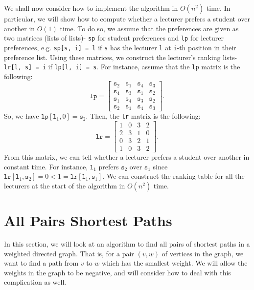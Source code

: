 \documentclass[a4paper, openany]{memoir}
\begin{document}
    We shall now consider how to implement the algorithm in $O(n^2)$ time. In particular, we will show how to compute whether a lecturer prefers a student over another in $O(1)$ time. To do so, we assume that the preferences are given as two matrices (lists of lists)- \texttt{sp} for student preferences and \texttt{lp} for lecturer preferences, e.g. \texttt{sp[s, i] = l} if \texttt{s} has the lecturer \texttt{l} at \texttt{i}-th position in their preference list. Using these matrices, we construct the lecturer's ranking lists- \texttt{lr[l, s] = i} if \texttt{lp[l, i] = s}. For instance, assume that the \texttt{lp} matrix is the following:
    \[\texttt{lp} = \begin{bmatrix}
        \texttt{s}_2 & \texttt{s}_1 & \texttt{s}_4 & \texttt{s}_3 \\
        \texttt{s}_4 & \texttt{s}_3 & \texttt{s}_1 & \texttt{s}_2 \\
        \texttt{s}_1 & \texttt{s}_4 & \texttt{s}_3 & \texttt{s}_2 \\
        \texttt{s}_2 & \texttt{s}_1 & \texttt{s}_4 & \texttt{s}_3
    \end{bmatrix}.\]
    So, we have $\texttt{lp}[\texttt{l}_1, 0] = \texttt{s}_2$. Then, the \texttt{lr} matrix is the following:
    \[\texttt{lr} = \begin{bmatrix}
        1 & 0 & 3 & 2 \\
        2 & 3 & 1 & 0 \\
        0 & 3 & 2 & 1 \\
        1 & 0 & 3 & 2
    \end{bmatrix}.\]
    From this matrix, we can tell whether a lecturer prefers a student over another in constant time. For instance, $\texttt{l}_1$ prefers $\texttt{s}_2$ over $\texttt{s}_1$ since $\texttt{lr}[\texttt{l}_1, \texttt{s}_2] = 0 < 1 = \texttt{lr}[\texttt{l}_1, \texttt{s}_1]$. We can construct the ranking table for all the lecturers at the start of the algorithm in $O(n^2)$ time.

    \newpage

    \section{All Pairs Shortest Paths}
    In this section, we will look at an algorithm to find all pairs of shortest paths in a weighted directed graph. That is, for a pair $(v, w)$ of vertices in the graph, we want to find a path from $v$ to $w$ which has the smallest weight. We will allow the weights in the graph to be negative, and will consider how to deal with this complication as well.
\end{document}
